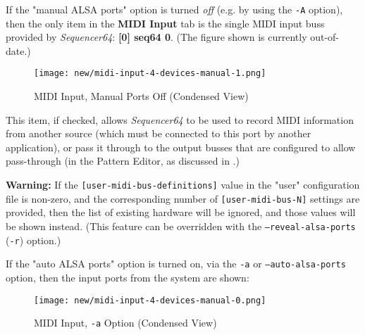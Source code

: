    If the "manual ALSA ports" option is turned \textsl{off} (e.g. by using the
   \texttt{-A} option),
   then the only item in the \textbf{MIDI Input} tab is the single MIDI input
   buss provided by \textsl{Sequencer64}:  \textbf{[0] seq64 0}.
   (The figure shown is currently out-of-date.)


\begin{figure}[H]
   \centering 
   \texttt{[image: new/midi-input-4-devices-manual-1.png]}
   \caption{MIDI Input, Manual Ports Off (Condensed View)}
   \label{fig:seq64_midi_input_4_devices_manual_1}
\end{figure}



   This item, if checked, allows \textsl{Sequencer64} to be used to record MIDI
   information from another source (which must be connected to this port by
   another application), or pass it through to the output busses
   that are configured to allow pass-through
   (in the Pattern Editor, as discussed in 
   .)

   \textbf{Warning:}
   If the 
   \texttt{[user-midi-bus-definitions]} value in the "user" configuration file
   is non-zero, and the
   corresponding number of
   \texttt{[user-midi-bus-N]} settings are provided, then
   the list of existing hardware will be ignored, and those values will be
   shown instead.
   (This feature can be overridden with the
   \texttt{--reveal-alsa-ports} (\texttt{-r}) option.)


   If the "auto ALSA ports" option is turned on, via the \texttt{-a} or
   \texttt{--auto-alsa-ports} option, then
   the input ports from the system are shown:

\begin{figure}[H]
   \centering 
   \texttt{[image: new/midi-input-4-devices-manual-0.png]}
   \caption{MIDI Input, \texttt{-a} Option (Condensed View)}
   \label{fig:seq64_midi_input_4_devices_manual_0}
\end{figure}

